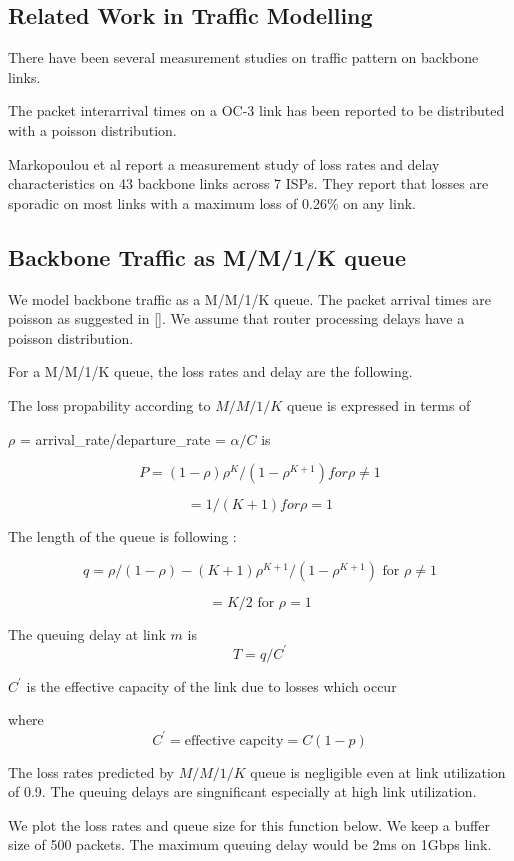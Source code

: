 \subsection{Related Work in Traffic Modelling}

There have been several measurement studies on traffic pattern on backbone links.

The packet interarrival times on a OC-3 link has been reported to be distributed with a poisson distribution. \cite{Karagiannis04anonstationary}

Markopoulou et al \cite{Markopoulou05} report a measurement study of loss rates and delay characteristics on 43 backbone links across 7 ISPs. They report that losses are sporadic on most links with a maximum loss of 0.26\% on any link.


\subsection{Backbone Traffic as M/M/1/K queue}
We model backbone traffic as a M/M/1/K queue. The packet arrival times are poisson as suggested in []. We assume that router processing delays have a poisson distribution.

For a  M/M/1/K queue, the loss rates and delay are the following.

The loss propability according to $M/M/1/K$ queue is expressed in terms of 

$\rho$ = arrival\_rate/departure\_rate = $\alpha/C$ is 

\[P = (1-\rho)\rho^{K} / (1 - \rho^{K +1}) for \rho \neq 1\]

\[= 1/(K+1) for \rho = 1\]

The length of the queue is following :

\[q = \rho/(1-\rho) - (K+1)\rho^{K+1}/(1- \rho^{K+1}) \mbox{ for }\rho \neq 1 \]

\[=K/2  \mbox{ for }\rho = 1\]

The queuing delay at link $m$ is
 \[T = q/C^\prime\]

$C^\prime$ is the effective capacity of the link due to losses which occur 

where \[C^\prime = \mbox{effective capcity} = C (1 - p)\]

The loss rates predicted by $M/M/1/K$ queue is negligible even at link utilization of 0.9. The queuing delays are singnificant especially at high link utilization.

We plot the loss rates and queue size for this function below. We keep a buffer size of 500 packets. The maximum queuing delay would be 2ms on 1Gbps link.

